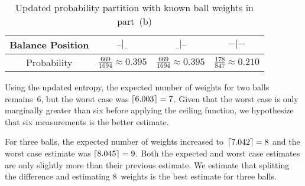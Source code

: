   \begin{table}
    \centering
    \caption{Updated probability partition with known ball weights in part~(b)}\label{tab:twoBallProbabilityBreakdownKnownWeights}
    \begin{tabular}{|c||c|c|c|}
      \hline
      Balance Position & $\bar{~}\bar{~}|\underline{~~}$  & $\underline{~~}|\bar{~}\bar{~}$  & $-|-$ \\\hline
      Probability      & $\frac{669}{1694} \approx 0.395$ & $\frac{669}{1694} \approx 0.395$ & $\frac{178}{847} \approx 0.210$   \\\hline
    \end{tabular}
  \end{table}

  Using the updated entropy, the expected number of weights for two balls remains~6, but the worst case was $\ceil{6.003} = 7$.  Given that the worst case is only marginally greater than six before applying the ceiling function, we hypothesize that six measurements is the better estimate.

  For three balls, the expected number of weights increased to~${\ceil*{7.042} = 8}$ and the worst case estimate was ${\ceil{8.045} = 9}$.  Both the expected and worst case estimates are only slightly more than their previous estimate.  We estimate that splitting the difference and estimating $8$~weights is the best estimate for three balls.